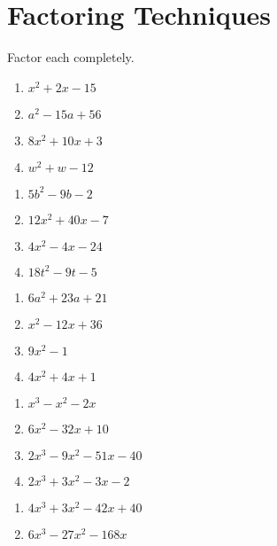 \chapter{Factoring Techniques}

Factor each completely.

\begin{multicols}{4}
\begin{enumerate}
	\item $x^2 + 2x - 15$
	\item $a^2-15a+56$
	\item $8x^2+10x+3$
	\item $w^2+w-12$
\end{enumerate}	\setcounter{Review}{\value{enumi}}
\end{multicols}
\begin{multicols}{4}
\begin{enumerate}	\setcounter{enumi}{\value{Review}}
	\item $5b^2-9b-2$
	\item $12x^2+40x-7$
	\item $4x^2-4x-24$
    \item $18t^2-9t-5$
\end{enumerate}	\setcounter{Review}{\value{enumi}}
\end{multicols}
\begin{multicols}{4}
\begin{enumerate}	\setcounter{enumi}{\value{Review}}
	\item $6a^2 + 23a + 21$
	\item $x^2-12x+36$
    \item $9x^2-1$
    \item $4x^2+4x+1$
\end{enumerate}	\setcounter{Review}{\value{enumi}}
\end{multicols}
\begin{multicols}{4}
\begin{enumerate}	\setcounter{enumi}{\value{Review}}
	\item $x^3-x^2-2x$
	\item $6x^2-32x+10$
	\item $2x^3-9x^2-51x-40$
	\item $2x^3+3x^2-3x-2$
\end{enumerate}	\setcounter{Review}{\value{enumi}}
\end{multicols}
\begin{multicols}{4}
\begin{enumerate}	\setcounter{enumi}{\value{Review}}
	\item $4x^3+3x^2-42x+40$
	\item $6x^3-27x^2-168x$
\end{enumerate}	\setcounter{Review}{\value{enumi}}
\end{multicols}

